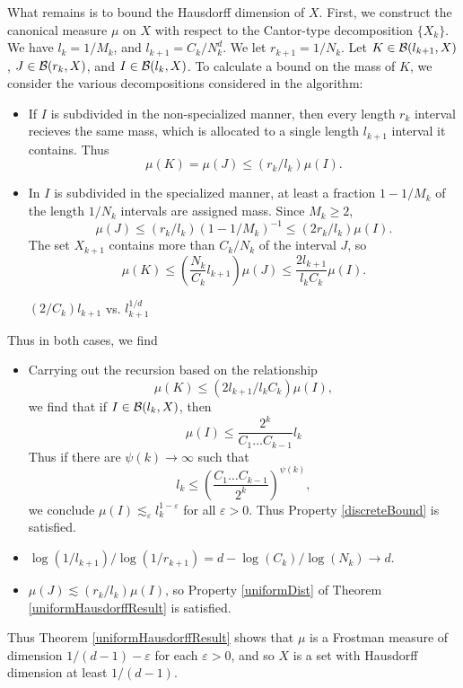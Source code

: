 What remains is to bound the Hausdorff dimension of $X$. First, we construct the canonical measure $\mu$ on $X$ with respect to the Cantor-type decomposition $\{ X_k \}$. We have $l_k = 1/M_k$, and $l_{k+1} = C_k/N_k^d$. We let $r_{k+1} = 1/N_k$. Let $K \in \operatorname{\mathcal{B}}(l_{k+1},X)$, $J \in \operatorname{\mathcal{B}}(r_k,X)$, and $I \in \operatorname{\mathcal{B}}(l_k,X)$. To calculate a bound on the mass of $K$, we consider the various decompositions considered in the algorithm:
%
\begin{itemize}
        \item If $I$ is subdivided in the non-specialized manner, then every length $r_k$ interval recieves the same mass, which is allocated to a single length $l_{k+1}$ interval it contains. Thus
        \[ \mu(K) = \mu(J) \leq (r_k/l_k) \mu(I). \]
        \item In $I$ is subdivided in the specialized manner, at least a fraction $1 - 1/M_k$ of the length $1/N_k$ intervals are assigned mass. Since $M_k \geq 2$,
        \[ \mu(J) \leq (r_k/l_k)(1 - 1/M_k)^{-1} \leq (2r_k/l_k) \mu(I). \]
        The set $X_{k+1}$ contains more than $C_k/N_k$ of the interval $J$, so
        \[ \mu(K) \leq \left( \frac{N_k}{C_k} l_{k+1} \right) \mu(J) \leq \frac{2 l_{k+1}}{l_k C_k} \mu(I). \]

        $(2/C_k) l_{k+1}$ vs. $l_{k+1}^{1/d}$
\end{itemize}
%
Thus in both cases, we find
%
\begin{itemize}
    \item Carrying out the recursion based on the relationship
    \[ \mu(K) \leq (2l_{k+1}/l_k C_k) \mu(I), \]
    we find that if $I \in \operatorname{\mathcal{B}}(l_k,X)$, then
    \[ \mu(I) \leq \frac{2^k}{C_1 \dots C_{k-1}} l_k \]
    Thus if there are $\psi(k) \to \infty$ such that
    \[ l_k \leq \left( \frac{C_1 \dots C_{k-1}}{2^k} \right)^{\psi(k)}, \]
    we conclude $\mu(I) \lesssim_\varepsilon l_k^{1 - \varepsilon}$ for all $\varepsilon > 0$. Thus Property \ref{discreteBound} is satisfied.

    \item $\log(1/l_{k+1})/\log(1/r_{k+1}) = d - \log(C_k)/\log(N_k) \to d$.

    \item $\mu(J) \lesssim (r_k/l_k) \mu(I)$, so Property \ref{uniformDist} of Theorem \ref{uniformHausdorffResult} is satisfied.
\end{itemize}
%
Thus Theorem \ref{uniformHausdorffResult} shows that $\mu$ is a Frostman measure of dimension $1/(d-1) - \varepsilon$ for each $\varepsilon > 0$, and so $X$ is a set with Hausdorff dimension at least $1/(d-1)$.

